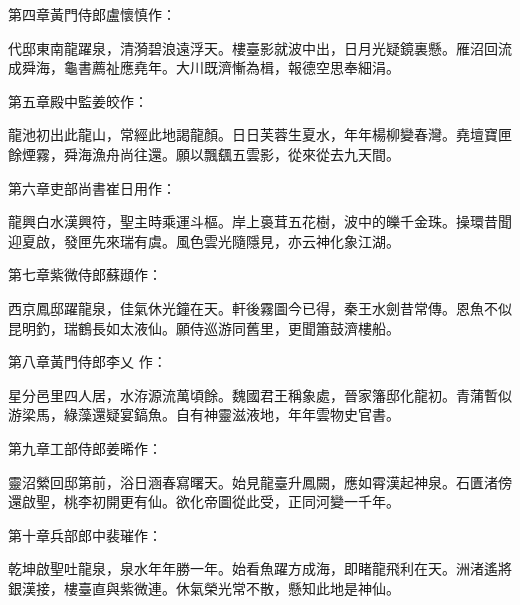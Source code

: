 \begin{pinyinscope}
 第四章黃門侍郎盧懷慎作：



 代邸東南龍躍泉，清漪碧浪遠浮天。樓臺影就波中出，日月光疑鏡裏懸。雁沼回流成舜海，龜書薦祉應堯年。大川既濟慚為楫，報德空思奉細涓。



 第五章殿中監姜皎作：



 龍池初出此龍山，常經此地謁龍顏。日日芙蓉生夏水，年年楊柳變春灣。堯壇寶匣餘煙霧，舜海漁舟尚往還。願以飄颻五雲影，從來從去九天間。



 第六章吏部尚書崔日用作：



 龍興白水漢興符，聖主時乘運斗樞。岸上裛茸五花樹，波中的皪千金珠。操環昔聞迎夏啟，發匣先來瑞有虞。風色雲光隨隱見，亦云神化象江湖。



 第七章紫微侍郎蘇頲作：



 西京鳳邸躍龍泉，佳氣休光鐘在天。軒後霧圖今已得，秦王水劍昔常傳。恩魚不似昆明釣，瑞鶴長如太液仙。願侍巡游同舊里，更聞簫鼓濟樓船。



 第八章黃門侍郎李乂
 作：



 星分邑里四人居，水洊源流萬頃餘。魏國君王稱象處，晉家籓邸化龍初。青蒲暫似游梁馬，綠藻還疑宴鎬魚。自有神靈滋液地，年年雲物史官書。



 第九章工部侍郎姜晞作：



 靈沼縈回邸第前，浴日涵春寫曙天。始見龍臺升鳳闕，應如霄漢起神泉。石匱渚傍還啟聖，桃李初開更有仙。欲化帝圖從此受，正同河變一千年。



 第十章兵部郎中裴璀作：



 乾坤啟聖吐龍泉，泉水年年勝一年。始看魚躍方成海，即睹龍飛利在天。洲渚遙將銀漢接，樓臺直與紫微連。休氣榮光常不散，懸知此地是神仙。



\end{pinyinscope}